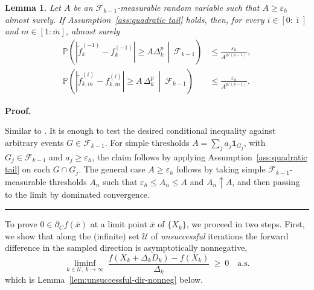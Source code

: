\documentclass[11pt,a4paper]{article}
\newtheorem{lemma}{Lemma}[section]
\newenvironment{proof}[1][Proof]{%
  \par\noindent\textbf{#1.}\ %
}{%
  \par\vspace{-0.5 ex}            %
  \noindent\hfill\rule{0.5em}{0.5em}\par
  \vspace{1ex}
}
\newcommand{\F}{\mathcal{F}}
\newcommand{\Pb}{\mathbb{P}}
\newcommand{\eh}{\varepsilon_h}
\newcommand{\f}{\tilde{f}}
\newcommand{\Imax}{\bar{\imath}}%
\newcommand{\Dexp}{p}
\newcommand{\aexp}{\Dexp/(\Dexp-1)}
\newcommand{\defeq}{\coloneqq}
\newcommand{\ind}{\mathbf{1}}   %
\begin{document}
\begin{lemma}\label{l:rv}
Let \(A\) be an \(\mathcal F_{k-1}\)-measurable random variable such that
\(A\ge\varepsilon_h\) almost surely. If
Assumption~\ref{ass:quadratic tail} holds, then, for every
\(i\in[0:\Imax]\) and \(m\in[1:\bar m]\), almost surely
\begin{equation*}
\begin{aligned}
    \mathbb P\left(
        |\f_k^{(-1)}-f_k^{(-1)}|
        \ge
        A\Delta_k^{\Dexp}
        \,\middle|\,
        \mathcal F_{k-1}
    \right)
    &\le
    \frac{\varepsilon_h}{A^{\aexp}},
    \\
    \mathbb P\!\left(
|\tilde f_{k,m}^{(i)}-f_{k,m}^{(i)}|
\ge
A\,\Delta_k^{\Dexp}
\ \middle|\ 
\F_{k-1}
\right)
&\le
\frac{\varepsilon_h}{A^{\aexp}}.
\end{aligned}
\end{equation*}
\end{lemma}
\begin{proof}
Similar to \cite[Lemma~2.3]{MR4758401}. It is enough to test the desired conditional inequality against arbitrary
events $G\in\mathcal F_{k-1}$. For simple thresholds
$A=\sum_j a_j\mathbf 1_{G_j}$, with $G_j\in\mathcal F_{k-1}$ and
$a_j\ge\varepsilon_h$, the claim follows by applying
Assumption~\ref{ass:quadratic tail} on each $G\cap G_j$. The general case
$A\ge\varepsilon_h$ follows by taking simple
$\mathcal F_{k-1}$-measurable thresholds $A_n$ such that
$\varepsilon_h\le A_n\le A$ and $A_n\uparrow A$, and then passing to the limit
by dominated convergence.
\end{proof}
To prove $0\in\partial_C f(\bar x)$ at a limit point $\bar x$ of $\{X_k\}$, we proceed in two steps. First, we show that along the (infinite) set $\mathcal{U}$ of \emph{unsuccessful} iterations the forward
difference in the sampled direction is asymptotically nonnegative,
\[
\liminf_{k\in \mathcal{U},\ k\to\infty}\ \frac{f(X_k+\Delta_k D_k)-f(X_k)}{\Delta_k}\ \ge\ 0\quad\text{a.s.}
\]
which is Lemma~\ref{lem:unsuccessful-dir-nonneg} below. 
\end{document}
